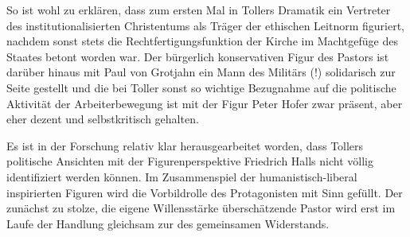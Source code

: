 So ist wohl zu erklären, dass zum ersten Mal in Tollers
Dramatik ein Vertreter des institutionalisierten Christentums als Träger der
ethischen Leitnorm figuriert, nachdem sonst stets die
Rechtfertigungsfunktion der Kirche im Machtgefüge des Staates betont worden
war.
Der bürgerlich konservativen Figur des Pastors ist darüber hinaus mit Paul von
Grotjahn ein Mann des
Militärs (!) solidarisch zur Seite gestellt und die bei Toller sonst so wichtige
Bezugnahme auf die politische Aktivität der Arbeiterbewegung ist mit der Figur
Peter Hofer zwar präsent, aber eher dezent und selbstkritisch gehalten. 

Es ist in der Forschung relativ klar herausgearbeitet worden, dass Tollers
politische Ansichten mit der Figurenperspektive Friedrich Halls nicht völlig identifiziert
werden können.
Im Zusammenspiel der humanistisch-liberal inspirierten Figuren wird die
Vorbildrolle des Protagonisten mit Sinn gefüllt. Der zunächst zu stolze, die
eigene Willensstärke überschätzende Pastor wird erst im Laufe der Handlung
gleichsam zur  des gemeinsamen Widerstands.  

